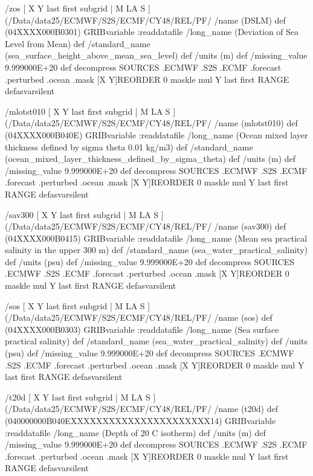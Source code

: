 \begin{ingrid}
/zos { [ X Y last first subgrid | M LA S ] (/Data/data25/ECMWF/S2S/ECMF/CY48/REL/PF/%
/name (DSLM) def
(04XXXX000B0301) GRIBvariable
:readdatafile
/long_name (Deviation of Sea Level from Mean) def
/standard_name (sea_surface_height_above_mean_sea_level) def
/units (m) def
/missing_value 9.999000E+20 def
decompress
  SOURCES .ECMWF .S2S .ECMF .forecast .perturbed .ocean .mask
  [X Y]REORDER
   0 maskle
   mul
Y last first RANGE
} defasvarsilent

/mlotst010 { [ X Y last first subgrid | M LA S ] (/Data/data25/ECMWF/S2S/ECMF/CY48/REL/PF/%
/name (mlotst010) def
(04XXXX000B040E) GRIBvariable
:readdatafile
/long_name (Ocean mixed layer thickness defined by sigma theta 0.01 kg/m3) def
/standard_name (ocean_mixed_layer_thickness_defined_by_sigma_theta) def
/units (m) def
/missing_value 9.999000E+20 def
decompress
  SOURCES .ECMWF .S2S .ECMF .forecast .perturbed .ocean .mask
  [X Y]REORDER
   0 maskle
   mul
Y last first RANGE
} defasvarsilent

/sav300 { [ X Y last first subgrid | M LA S ] (/Data/data25/ECMWF/S2S/ECMF/CY48/REL/PF/%
/name (sav300) def
(04XXXX000B0415) GRIBvariable
:readdatafile
/long_name (Mean sea practical salinity in the upper 300 m) def
/standard_name (sea_water_practical_salinity) def
/units (psu) def
/missing_value 9.999000E+20 def
decompress
  SOURCES .ECMWF .S2S .ECMF .forecast .perturbed .ocean .mask
  [X Y]REORDER
   0 maskle
   mul
Y last first RANGE
} defasvarsilent


/sos { [ X Y last first subgrid | M LA S ] (/Data/data25/ECMWF/S2S/ECMF/CY48/REL/PF/%
/name (sos) def
(04XXXX000B0303) GRIBvariable
:readdatafile
/long_name (Sea surface practical salinity) def
/standard_name (sea_water_practical_salinity) def
/units (psu) def
/missing_value 9.999000E+20 def
decompress
  SOURCES .ECMWF .S2S .ECMF .forecast .perturbed .ocean .mask
  [X Y]REORDER
   0 maskle
   mul
Y last first RANGE
} defasvarsilent

/t20d { [ X Y last first subgrid | M LA S ] (/Data/data25/ECMWF/S2S/ECMF/CY48/REL/PF/%
/name (t20d) def
(040000000B040EXXXXXXXXXXXXXXXXXXXXXX14) GRIBvariable
:readdatafile
/long_name (Depth of 20 C isotherm) def
/units (m) def
/missing_value 9.999000E+20 def
decompress
  SOURCES .ECMWF .S2S .ECMF .forecast .perturbed .ocean .mask
  [X Y]REORDER
   0 maskle
   mul
 Y last first RANGE
} defasvarsilent


\end{ingrid}
